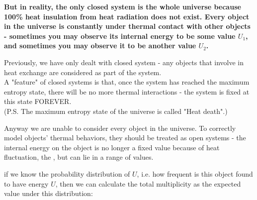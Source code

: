 \documentclass[class=article, crop=false, 12pt]{standalone}
\begin{document}

\bf{But in reality, the only closed system is the whole universe}
because 100\% heat insulation from heat radiation does not exist.
Every object in the universe is constantly under thermal contact with other objects - 
sometimes you may observe its internal energy to be some value $U_1$,
and sometimes you may observe it to be another value $U_2$.

\begin{center}
\end{center}




Previously, we have only dealt with closed system - 
any objects that involve in heat exchange are considered as part of the system.
\\

\iffalse
A "feature" of closed systems is that, 
once the system has reached the maximum entropy state,
there will be no more thermal interactions -
the system is fixed at this state FOREVER.\\
(P.S. The maximum entropy state of the universe is called "Heat death".)



Anyway we are unable to consider every object in the universe.
To correctly model objects' thermal behaviors,
they should be treated as open systems - 
the internal energy on the object is no longer a fixed value because of heat fluctuation,
the ,
but can lie in a range of values.





if we know the probability distribution of $U$, 
i.e. how frequent is this object found to have energy $U$, 
then we can calculate the total multiplicity as the expected value under this distribution:
\end{document}
